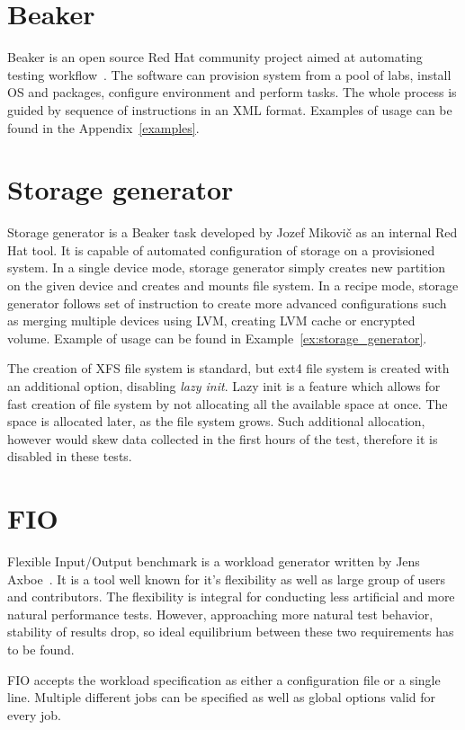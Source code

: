 \documentclass[
  color, %
  table, %
  lof,   %
  lot,   %
]{fithesis3}
\begin{document}
\section{Beaker}
Beaker is an open source Red Hat community project aimed at automating testing workflow~\cite{beaker}. The software can provision system from a pool of labs, install OS and packages, configure environment and perform tasks. The whole process is guided by sequence of instructions in an XML format. Examples of usage can be found in the Appendix~\ref{examples}.

\section{Storage generator}
Storage generator is a Beaker task developed by Jozef Mikovič as an internal Red Hat tool. It is capable of automated configuration of storage on a provisioned system. In a single device mode, storage generator simply creates new partition on the given device and creates and mounts file system. In a recipe mode, storage generator follows set of instruction to create more advanced configurations such as merging multiple devices using LVM, creating LVM cache or encrypted volume. Example of usage can be found in Example~\ref{ex:storage_generator}.

The creation of XFS file system is standard, but ext4 file system is created with an additional option, disabling \emph{lazy init}. Lazy init is a feature which allows for fast creation of file system by not allocating all the available space at once. The space is allocated later, as the file system grows. Such additional allocation, however would skew data collected in the first hours of the test, therefore it is disabled in these tests.

\section{FIO}
Flexible Input/Output benchmark is a workload generator written by Jens Axboe~\cite{fio:github}. It is a tool well known for it's flexibility as well as large group of users and contributors. The flexibility is integral for conducting less artificial and more natural performance tests. However, approaching more natural test behavior, stability of results drop, so ideal equilibrium between these two requirements has to be found.

FIO accepts the workload specification as either a configuration file or a single line. Multiple different jobs can be specified as well as global options valid for every job. 
\end{document}
